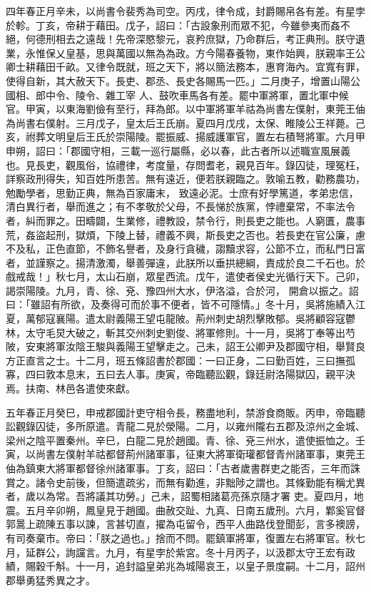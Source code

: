 \begin{pinyinscope}
 四年春正月辛未，以尚書令裴秀為司空。丙戌，律令成，封爵賜帛各有差。有星孛於軫。丁亥，帝耕于藉田。戊子，詔曰：「古設象刑而眾不犯，今雖參夷而姦不絕，何德刑相去之遠哉！先帝深愍黎元，哀矜庶獄，乃命群后，考正典刑。朕守遺業，永惟保乂皇基，思與萬國以無為為政。方今陽春養物，東作始興，朕親率王公卿士耕藉田千畝。又律令既就，班之天下，將以簡法務本，惠育海內。宜寬有罪，使得自新，其大赦天下。長吏、郡丞、長史各賜馬一匹。」二月庚子，增置山陽公國相、郎中令、陵令、雜工宰
 人、鼓吹車馬各有差。罷中軍將軍，置北軍中候官。甲寅，以東海劉儉有至行，拜為郎。以中軍將軍羊祜為尚書左僕射，東莞王伷為尚書右僕射。三月戊子，皇太后王氏崩。夏四月戊戌，太保、睢陵公王祥薨。己亥，祔葬文明皇后王氏於崇陽陵。罷振威、揚威護軍官，置左右積弩將軍。六月甲申朔，詔曰：「郡國守相，三載一巡行屬縣，必以春，此古者所以述職宣風展義也。見長吏，觀風俗，協禮律，考度量，存問耆老，親見百年。錄囚徒，理冤枉，詳察政刑得失，知百姓所患苦。無有遠近，便若朕親臨之。敦喻五教，勸務農功，勉勵學者，思勤正典，無為百家庸末，
 致遠必泥。士庶有好學篤道，孝弟忠信，清白異行者，舉而進之；有不孝敬於父母，不長悌於族黨，悖禮棄常，不率法令者，糾而罪之。田疇闢，生業修，禮教設，禁令行，則長吏之能也。人窮匱，農事荒，姦盜起刑，獄煩，下陵上替，禮義不興，斯長吏之否也。若長吏在官公廉，慮不及私，正色直節，不飾名譽者，及身行貪穢，謅黷求容，公節不立，而私門日富者，並謹察之。揚清激濁，舉善彈違，此朕所以垂拱總綱，責成於良二千石也。於戲戒哉！」秋七月，太山石崩，眾星西流。戊午，遣使者侯史光循行天下。己卯，謁崇陽陵。九月，青、徐、兗、豫四州大水，伊洛溢，合於河，
 開倉以振之。詔曰：「雖詔有所欲，及奏得可而於事不便者，皆不可隱情。」冬十月，吳將施績入江夏，萬郁寇襄陽。遣太尉義陽王望屯龍陂。荊州刺史胡烈擊敗郁。吳將顧容寇鬱林，太守毛炅大破之，斬其交州刺史劉俊、將軍修則。十一月，吳將丁奉等出芍陂，安東將軍汝陰王駿與義陽王望擊走之。己未，詔王公卿尹及郡國守相，舉賢良方正直言之士。十二月，班五條詔書於郡國：一曰正身，二曰勤百姓，三曰撫孤寡，四曰敦本息末，五曰去人事。庚寅，帝臨聽訟觀，錄廷尉洛陽獄囚，親平決焉。扶南、林邑各遣使來獻。



 五年春正月癸巳，申戒郡國計吏守相令長，務盡地利，禁游食商販。丙申，帝臨聽訟觀錄囚徒，多所原遣。青龍二見於滎陽。二月，以雍州隴右五郡及涼州之金城、梁州之陰平置秦州。辛巳，白龍二見於趙國。青、徐、兗三州水，遣使振恤之。壬寅，以尚書左僕射羊祜都督荊州諸軍事，征東大將軍衛瓘都督青州諸軍事，東莞王伷為鎮東大將軍都督徐州諸軍事。丁亥，詔曰：「古者歲書群吏之能否，三年而誅賞之。諸令史前後，但簡遣疏劣，而無有勸進，非黜陟之謂也。其條勤能有稱尤異者，歲以為常。吾將議其功勞。」己未，詔蜀相諸葛亮孫京隨才署
 吏。夏四月，地震。五月辛卯朔，鳳皇見于趙國。曲赦交趾、九真、日南五歲刑。六月，鄴奚官督郭暠上疏陳五事以諫，言甚切直，擢為屯留令，西平人曲路伐登聞彭，言多襖謗，有司奏棄市。帝曰：「朕之過也。」捨而不問。罷鎮軍將軍，復置左右將軍官。秋七月，延群公，詢讜言。九月，有星孛於紫宮。冬十月丙子，以汲郡太守王宏有政績，賜穀千斛。十一月，追封謚皇弟兆為城陽哀王，以皇子景度嗣。十二月，詔州郡舉勇猛秀異之才。




\end{pinyinscope}
